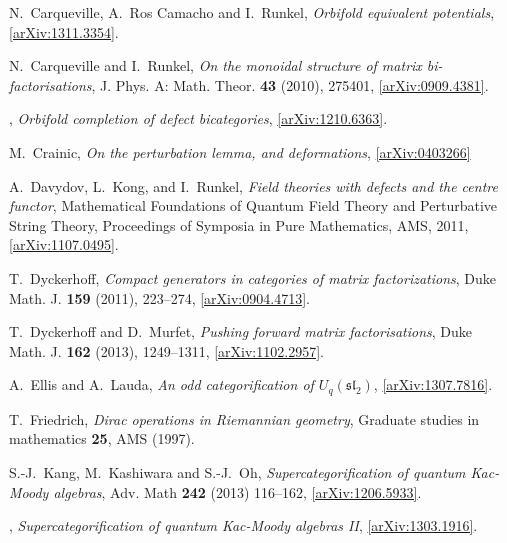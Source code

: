 \documentclass[english,letter paper,12pt,leqno]{article}
\theoremstyle{example}
\numberwithin{equation}{section}
\begin{document}
\begin{thebibliography}{BHLS03}
N.~Carqueville, A.~Ros Camacho and I.~Runkel, \textsl{Orbifold equivalent potentials}, \href{http://arxiv.org/abs/1311.3354}{[arXiv:1311.3354]}.

N.~Carqueville and I.~Runkel, \textsl{On the monoidal structure of matrix bi-factorisations}, J. Phys.
  A: Math. Theor. \textbf{43} (2010), 275401,
  \href{http://arxiv.org/abs/0909.4381}{[arXiv:0909.4381]}.
  
\bysame, \textsl{Orbifold completion of defect bicategories}, 
\href{http://arxiv.org/abs/1210.6363}{[arXiv:1210.6363]}.

M.~Crainic, \emph{On the perturbation lemma, and deformations}, \href{http://arxiv.org/abs/math/0403266}{[arXiv:0403266]}

A.~Davydov, L.~Kong, and I.~Runkel, \textsl{Field theories with defects and the
  centre functor}, Mathematical Foundations of Quantum Field Theory and Perturbative String Theory, 
  Proceedings of Symposia in Pure Mathematics, AMS, 2011, \href{http://arxiv.org/abs/1107.0495}{[arXiv:1107.0495]}.
  
T.~Dyckerhoff, \textsl{Compact generators in categories of matrix factorizations},
  Duke Math. J. \textbf{159} (2011), 223--274,
  \href{http://arxiv.org/abs/0904.4713}{[arXiv:0904.4713]}.

T.~Dyckerhoff and D.~Murfet, \textsl{Pushing forward matrix factorisations}, Duke Math. J. \textbf{162} (2013), 1249--1311, \href{http://arxiv.org/abs/1102.2957}{[arXiv:1102.2957]}.

A.~Ellis and A.~Lauda, \textsl{An odd categorification of $U_q(\mathfrak{sl}_2)$}, \href{http://arxiv.org/abs/1307.7816}{[arXiv:1307.7816]}.

T.~Friedrich, \textsl{{D}irac operations in {R}iemannian geometry}, Graduate studies in mathematics \textbf{25}, AMS (1997).
  

S.-J.~Kang, M.~Kashiwara and S.-J.~Oh, \textsl{Supercategorification of quantum Kac-Moody algebras}, Adv. Math \textbf{242} (2013) 116--162, \href{http://arxiv.org/abs/1206.5933}{[arXiv:1206.5933]}.

\bysame, \textsl{Supercategorification of quantum Kac-Moody algebras II}, \href{http://arxiv.org/abs/1303.1916}{[arXiv:1303.1916]}.


\end{thebibliography}
\end{document}
